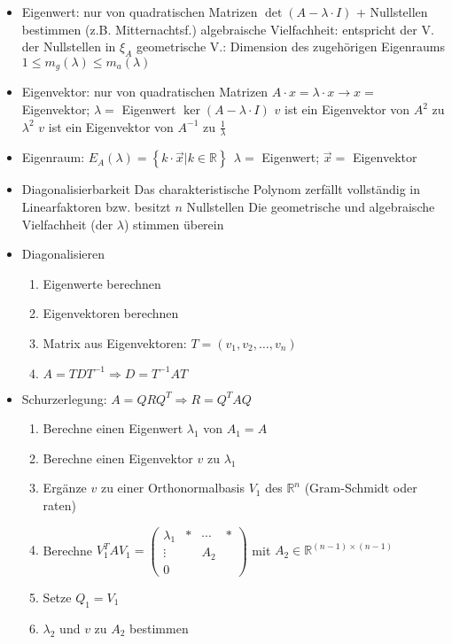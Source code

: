 \documentclass[7pt,a4paper]{scrartcl}
\newcommand{\R}{\ensuremath{\mathbb R}}
\begin{document}
\begin{multicols}{3}
\begin{itemize}
	\item Eigenwert: nur von quadratischen Matrizen
		\subitem $\det(A-\lambda \cdot I)$ + Nullstellen bestimmen (z.B. Mitternachtsf.)
			\subitem algebraische Vielfachheit: entspricht der V. der Nullstellen in $\xi_A$
			\subitem geometrische V.: Dimension des zugehörigen Eigenraums
			\subitem $1\leq m_g(\lambda)\leq m_a(\lambda)$
	\item Eigenvektor: nur von quadratischen Matrizen
		\subitem $A\cdot x = \lambda \cdot x \rightarrow x=$ Eigenvektor; $\lambda=$ Eigenwert
		\subitem $\ker(A-\lambda\cdot I)$
		\subitem $v$ ist ein Eigenvektor von $A^2$ zu $\lambda^2$
		\subitem $v$ ist ein Eigenvektor von $A^{-1}$ zu $\frac{1}{\lambda}$
	\item Eigenraum: $E_A(\lambda) = \left\lbrace k \cdot \vec{x} | k \in \R \right\rbrace ~~ \lambda=$ Eigenwert; $\vec{x}=$ Eigenvektor
	\item Diagonalisierbarkeit
		\subitem Das charakteristische Polynom zerfällt vollständig in Linearfaktoren bzw. besitzt $n$ Nullstellen
		\subitem Die geometrische und algebraische Vielfachheit (der $\lambda$) stimmen überein
	\item Diagonalisieren
	\begin{enumerate}
		\item Eigenwerte berechnen
		\item Eigenvektoren berechnen
		\item Matrix aus Eigenvektoren: $T=\left(v_1, v_2, … , v_n\right)$
		\item $A=T D T^{-1} \Rightarrow D = T^{-1} A T$
	\end{enumerate}
	\item Schurzerlegung: $A=Q R Q^T \Rightarrow R=Q^T A Q$
		\begin{enumerate}
			\item Berechne einen Eigenwert $\lambda_1$ von $A_1=A$
			\item Berechne einen Eigenvektor $v$ zu $\lambda_1$
			\item Ergänze $v$ zu einer Orthonormalbasis $V_1$ des $\R^n$ (Gram-Schmidt oder raten)
			\item Berechne $V_1^T A V_1 = \begin{pmatrix}
				\lambda_1 & * & \cdots & * \\
				\vdots & & A_2 \\
				0 
			\end{pmatrix}$ mit $A_2 \in \R^{(n-1)\times(n-1)}$
			\item Setze $Q_1=V_1$
			\item $\lambda_2$ und $v$ zu $A_2$ bestimmen

\end{enumerate}
\end{itemize}
\end{multicols}
\end{document}
